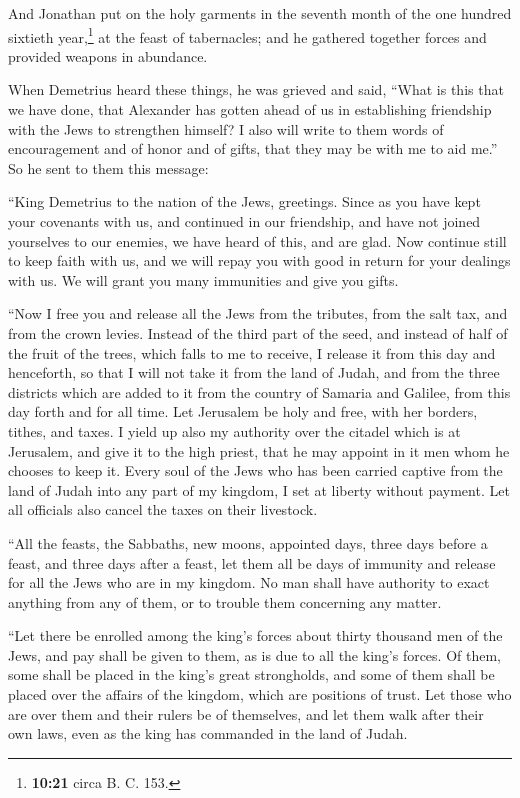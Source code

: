  And Jonathan put on the holy garments in the seventh
month of the one hundred sixtieth year,\footnote{\textbf{10:21} circa B.
  C. 153.} at the feast of tabernacles; and he gathered together forces
and provided weapons in abundance.

 When Demetrius heard these things, he was grieved and
said,  ``What is this that we have done, that Alexander
has gotten ahead of us in establishing friendship with the Jews to
strengthen himself?  I also will write to them words of
encouragement and of honor and of gifts, that they may be with me to aid
me.''  So he sent to them this message:

``King Demetrius to the nation of the Jews, greetings. 
Since as you have kept your covenants with us, and continued in our
friendship, and have not joined yourselves to our enemies, we have heard
of this, and are glad.  Now continue still to keep faith
with us, and we will repay you with good in return for your dealings
with us.  We will grant you many immunities and give you
gifts.

 ``Now I free you and release all the Jews from the
tributes, from the salt tax, and from the crown levies. 
Instead of the third part of the seed, and instead of half of the fruit
of the trees, which falls to me to receive, I release it from this day
and henceforth, so that I will not take it from the land of Judah, and
from the three districts which are added to it from the country of
Samaria and Galilee, from this day forth and for all time.
 Let Jerusalem be holy and free, with her borders,
tithes, and taxes.  I yield up also my authority over the
citadel which is at Jerusalem, and give it to the high priest, that he
may appoint in it men whom he chooses to keep it.  Every
soul of the Jews who has been carried captive from the land of Judah
into any part of my kingdom, I set at liberty without payment. Let all
officials also cancel the taxes on their livestock.

 ``All the feasts, the Sabbaths, new moons, appointed
days, three days before a feast, and three days after a feast, let them
all be days of immunity and release for all the Jews who are in my
kingdom.  No man shall have authority to exact anything
from any of them, or to trouble them concerning any matter.

 ``Let there be enrolled among the king's forces about
thirty thousand men of the Jews, and pay shall be given to them, as is
due to all the king's forces.  Of them, some shall be
placed in the king's great strongholds, and some of them shall be placed
over the affairs of the kingdom, which are positions of trust. Let those
who are over them and their rulers be of themselves, and let them walk
after their own laws, even as the king has commanded in the land of
Judah.

